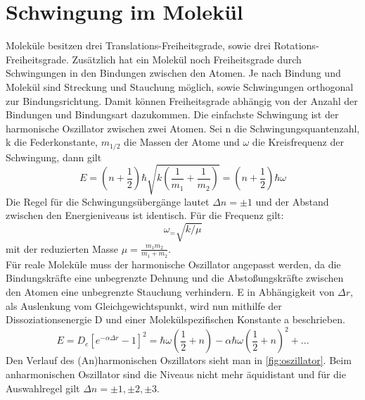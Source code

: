 \documentclass[.../bericht]{subfilies}
\begin{document}
  \section{Schwingung im Molekül}

    Moleküle besitzen drei Translations-Freiheitsgrade, sowie drei Rotations-Freiheitsgrade. Zusätzlich hat ein Molekül noch Freiheitsgrade durch Schwingungen in den Bindungen zwischen den Atomen. Je nach Bindung und Molekül sind Streckung und Stauchung möglich, sowie Schwingungen orthogonal zur Bindungsrichtung.  Damit können Freiheitsgrade abhängig von der Anzahl der Bindungen und Bindungsart dazukommen. Die einfachste Schwingung ist der harmonische Oszillator zwischen zwei Atomen. Sei n die Schwingungsquantenzahl, k die Federkonstante, $m_{1/2}$ die Massen der Atome und $\omega$ die Kreisfrequenz der Schwingung, dann gilt
    \begin{equation}
      E=(n+\frac{1}{2})\hbar \sqrt{k(\frac{1}{m_1}+\frac{1}{m_2})}=(n+\frac{1}{2})\hbar \omega
      \label{eq:harmonischeroszi}
    \end{equation}
    Die Regel für die Schwingungsübergänge lautet $\Delta n= \pm 1$ und der Abstand zwischen den Energieniveaus ist identisch. Für die Frequenz gilt:
    \begin{equation*}
      \omega_=\sqrt{k/\mu}
    \end{equation*}
    mit der reduzierten Masse $\mu=\frac{m_1m_2}{m_1+m_2}$.\\
    Für reale Moleküle muss der harmonische Oszillator angepasst werden, da die Bindungskräfte eine unbegrenzte Dehnung und die Abstoßungskräfte zwischen den Atomen eine unbegrenzte Stauchung verhindern. E in Abhängigkeit von $\Delta r$, als Auslenkung vom Gleichgewichtspunkt, wird nun mithilfe der Dissoziationsenergie D und einer Molekülspezifischen Konstante a beschrieben.
    \begin{equation}
      E=D_e[e^{-\alpha \Delta r}-1]^2=\hbar \omega(\frac{1}{2}+n)-\alpha \hbar \omega (\frac{1}{2}+n)^2+...
      \label{eq:anharmonischerosz}
    \end{equation}
    Den Verlauf des (An)harmonischen Oszillators sieht man in \cref{fig:oszillator}.
    Beim anharmonischen Oszillator sind die Niveaus nicht mehr äquidistant und für die Auswahlregel gilt $\Delta n= \pm 1, \pm 2, \pm 3$.\\
\end{document}
